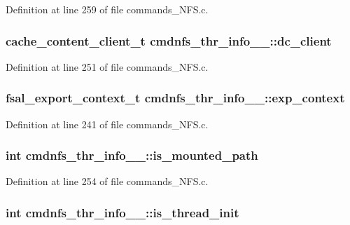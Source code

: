 Definition at line 259 of file commands\_\-NFS.c.
\subsubsection[{dc\_\-client}]{\setlength{\rightskip}{0pt plus 5cm}cache\_\-content\_\-client\_\-t {\bf cmdnfs\_\-thr\_\-info\_\-\_\-::dc\_\-client}}\label{structcmdnfs__thr__info_____a25559c5388210fe7b20f047d80e9d969}


Definition at line 251 of file commands\_\-NFS.c.
\subsubsection[{exp\_\-context}]{\setlength{\rightskip}{0pt plus 5cm}fsal\_\-export\_\-context\_\-t {\bf cmdnfs\_\-thr\_\-info\_\-\_\-::exp\_\-context}}\label{structcmdnfs__thr__info_____a258f911ec1e74edf76d91c76c71befd1}


Definition at line 241 of file commands\_\-NFS.c.
\subsubsection[{is\_\-mounted\_\-path}]{\setlength{\rightskip}{0pt plus 5cm}int {\bf cmdnfs\_\-thr\_\-info\_\-\_\-::is\_\-mounted\_\-path}}\label{structcmdnfs__thr__info_____acbab9ed57819b5a75c263ce6a7f2e40d}


Definition at line 254 of file commands\_\-NFS.c.
\subsubsection[{is\_\-thread\_\-init}]{\setlength{\rightskip}{0pt plus 5cm}int {\bf cmdnfs\_\-thr\_\-info\_\-\_\-::is\_\-thread\_\-init}}\label{structcmdnfs__thr__info_____a09a128121a4c53f19ab460858c4a4487}


